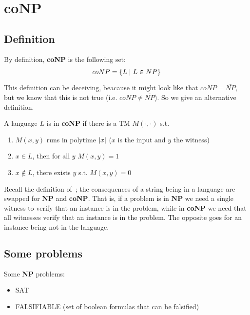 \section{coNP}\label{sec:conp}

\subsection{Definition}\label{subsec:conp_def}
    By definition, \textbf{coNP} is the following set:
    \[ coNP = \{ L \; \vert \; \bar{L} \in NP \} \]

    This definition can be deceiving, beacause it might look like that $coNP = \bar{NP}$, but we know that this is not true (i.e. $coNP \neq \bar{NP}$).
    So we give an alternative definition.

    \begin{definition}\label{def:coNP}
        A language $L$ is in \textbf{coNP} if there is a TM $M(\cdot, \cdot)$ s.t.
        \begin{enumerate}
            \item $M(x,y)$ runs in polytime \wrt{} $\vert x \vert$ ($x$ is the input and $y$ the witness)
            \item $x \in L$, then for all $y$ $M(x,y) = 1$
            \item $x \not\in L$, there exists $y$ s.t. $M(x,y) = 0$
        \end{enumerate}
    \end{definition}

    Recall the definition of~; the consequences of a string being in a language are swapped for \textbf{NP} and \textbf{coNP}.
    That is, if a problem is in \textbf{NP} we need a single witness to verify that an instance is in the problem, while in \textbf{coNP} we need that all witnesses verify that an instance is in the problem.
    The opposite goes for an instance being not in the language.


\subsection{Some problems}\label{subsec:conp_problems}
    Some \textbf{NP} problems:
    \begin{itemize}
        \item SAT
        \item FALSIFIABLE (set of boolean formulas that can be falsified)
    \end{itemize}

